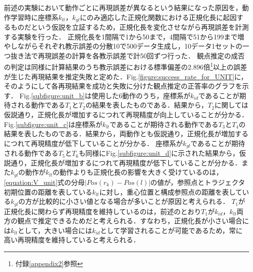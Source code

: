 前述の実験において動作ごとに再現誤差が異なるという結果になった原因を，動作学習時に座標系$k_{lt}$，$k_{gl}$にのみ適応した正規化関数における正規化長に起因するものだという仮説を立証するため，正規化長を変化させながら再現誤差を計測する実験を行った．
正規化長を1間隔で1から50まで，4間隔で51から199まで増やしながらそれぞれ教示誤差の分散10で500データ生成し，10データ1セットの一つ抜き法で再現誤差の計算を各教示誤差で計50回ずつ行った．
観点推定の成否の判定は同様に計算結果のうち教示誤差における標準偏差の2.896倍\footnote{付録\ref{appendix2}参照}以上の誤差が生じた再現結果を推定失敗と定めた．Fig.\ref{figure:success_rate_for_UNIT}に，そのようにして各再現結果を成功と失敗に分けた観点推定の正答率のグラフを示す．
Fig.\ref{subfigure:unit_b}は使用した6動作のうち，座標系が$k_{id}$であることが期待される動作である$T_{1}$と$T_{2}$の結果を表したものである．結果から，$T_{2}$に関しては仮説通り，正規化長が増加するにつれて再現精度が向上していることが分かる．
Fig.\ref{subfigure:unit_c}は座標系が$k_{lt}$であることが期待される動作である$T_{3}$と$T_{4}$の結果を表したものである．結果から，両動作とも仮説通り，正規化長が増加するにつれて再現精度が低下していることが分かる．
座標系が$k_{gl}$であることが期待される動作である$T_{5}$と$T_{6}$も同様にFig.\ref{subfigure:unit_d}に示された結果から，仮説通り，正規化長が増加するにつれて再現精度が低下していることが分かる．また$k_{gl}$の動作が$k_{lt}$の動作よりも正規化長の影響を大きく受けているのは，\ref{equation:V_unit}式の分母$| Pos(r_{k})-Pos(l) |$の値が，参照点とトラジェクタ初期位置の距離を表している$k_{lt}$に対し，重心位置と構成参照点の距離を表している$k_{gl}$の方が比較的に小さい値となる場合が多いことが原因と考えられる．
$T_{1}$が正規化長に関わらず再現精度を維持しているのは，前述のとおり$T_{1}$が$k_{id}$，$k_{lt}$両方の観点で推定できるためだと考えられる．すなわち，正規化長が小さい場合には$k_{lt}$として，大きい場合には$k_{id}$として学習されることが可能であるため，常に高い再現精度を維持していると考えられる．

